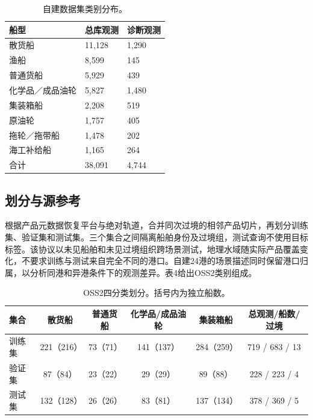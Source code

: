 \documentclass[journal,10pt,a4paper]{IEEEtran}
\begin{document}
\begin{table}[H]
\centering\footnotesize
\setcounter{table}{2}
\caption{自建数据集类别分布。}
\label{tab:3}
\setlength{\tabcolsep}{3pt}\renewcommand{\arraystretch}{1.2}
\begin{tabularx}{\linewidth}{LLL}
\toprule
船型 & 总库观测 & 诊断观测 \\
\midrule
散货船 & 11,128 & 1,290 \\
渔船 & 8,599 & 145 \\
普通货船 & 5,929 & 439 \\
化学品／成品油轮 & 5,827 & 1,480 \\
集装箱船 & 2,208 & 519 \\
原油轮 & 1,757 & 405 \\
拖轮／拖带船 & 1,478 & 202 \\
海工补给船 & 1,165 & 264 \\
合计 & 38,091 & 4,744 \\
\bottomrule
\end{tabularx}
\end{table}

\subsection{划分与源参考}\label{ux5212ux5206ux4e0eux6e90ux53c2ux8003}

根据产品元数据恢复平台与绝对轨道，合并同次过境的相邻产品切片，再划分训练集、验证集和测试集。三个集合之间隔离船舶身份及过境组，测试查询不使用目标标签。该协议以未见船舶和未见过境组织跨场景测试，地理水域随实际产品覆盖变化，不要求训练与测试来自完全不同的港口。自建24港的场景描述同时保留港口归属，以分析同港和异港条件下的观测差异。表4给出OSS2类别组成。

\begin{table}[!t]
\centering\footnotesize
\setcounter{table}{3}
\caption{OSS2四分类划分。括号内为独立船数。}
\label{tab:4}
\setlength{\tabcolsep}{3pt}\renewcommand{\arraystretch}{1.2}
\begin{tabularx}{\linewidth}{LCCCCC}
\toprule
集合 & 散货船 & 普通货船 & 化学品/成品油轮 & 集装箱船 & 总观测/船数/过境 \\
\midrule
训练集 & 221（216） & 73（71） & 141（137） & 284（259） & 719 / 683 / 13 \\
验证集 & 87（84） & 23（22） & 29（29） & 89（88） & 228 / 223 / 4 \\
测试集 & 132（128） & 26（26） & 83（81） & 137（134） & 378 / 369 / 5 \\
\bottomrule
\end{tabularx}
\end{table}
\end{document}
